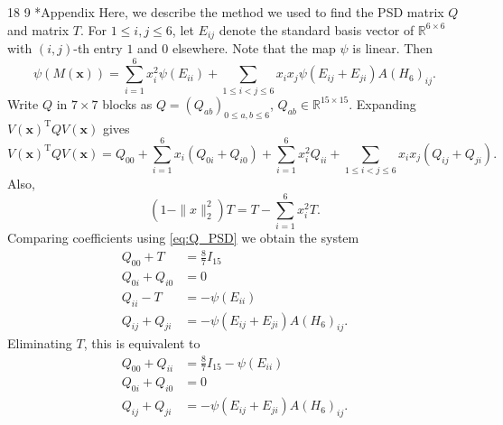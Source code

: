 \documentclass[11pt]{article}
\makeatletter
\renewcommand\section{\@startsection{section}{1}{\z@}%
{18\p@ \@plus 6\p@ \@minus 3\p@}%
{9\p@ \@plus 6\p@ \@minus 3\p@}%
{\large\bfseries\boldmath}}
\theoremstyle{plain}
\theoremstyle{definition}
\numberwithin{equation}{section}
\makeatother
\begin{document}
\section*{Appendix}
\label{sec:Appendix}
Here, we describe the method we used to find the PSD matrix $Q$ and matrix $T$. For $1\leq i, j\leq 6$, 
let $E_{ij}$ denote the standard basis vector of $\mathbb{R}^{6\times 6}$ with $(i,j)$-th entry $1$ and 
$0$ elsewhere. Note that the map $\psi$ is linear. Then
\begin{equation}
   \psi(M(\bm{x})) = \sum_{i=1}^6 x_i^2 \psi(E_{ii}) +\sum_{1\leq i<j\leq 6} x_i x_j \psi(E_{ij} + E_{ji})A(H_{6})_{ij}. 
\end{equation}
Write $Q$ in $7\times 7$ blocks as $Q=(Q_{ab})_{0\leq a,b\leq 6}$, $Q_{ab}\in \mathbb R^{15\times 15}$. 
Expanding $V(\bm{x})^{\mathrm{T}} QV(\bm{x})$ gives
\begin{equation}
V(\bm{x})^{\mathrm{T}} QV(\bm{x}) =
Q_{00}
+\sum_{i=1}^6 x_i(Q_{0i}+Q_{i0})
+\sum_{i=1}^6 x_i^2 Q_{ii}
+\sum_{1\leq i<j\leq 6} x_i x_j(Q_{ij}+Q_{ji}).
\end{equation}
Also,
\begin{equation}
(1-\|x\|_2^2)T = T-\sum_{i=1}^6 x_i^2 T.
\end{equation}
Comparing coefficients using \eqref{eq:Q_PSD} we obtain the system
\begin{align}
    Q_{00}+T & =\frac87 I_{15}\nonumber \\
    Q_{0i}+Q_{i0} & =0 \nonumber \\
    Q_{ii}-T & =-\psi(E_{ii}) \nonumber \\
    Q_{ij}+Q_{ji} & =-\psi(E_{ij} + E_{ji})A(H_{6})_{ij}.
\end{align}
Eliminating $T$, this is equivalent to
\begin{align} \label{Eqn:Coeff_matching}
Q_{00}+Q_{ii} & =\frac87 I_{15}-\psi(E_{ii})\nonumber \\
Q_{0i}+Q_{i0} & =0 \nonumber \\
Q_{ij}+Q_{ji} & =-\psi(E_{ij} + E_{ji})A(H_{6})_{ij}.
\end{align}
\end{document}
